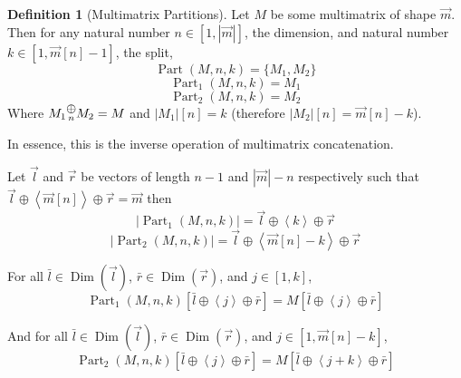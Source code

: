 \documentclass[12pt]{book}
\theoremstyle{plain}
\theoremstyle{definition}
\newtheorem{definition}{Definition}[chapter]
\theoremstyle{ppart}
\theoremstyle{case}
\theoremstyle{solution}
\DeclareMathOperator{\Dim}{Dim}
\DeclareMathOperator{\Part}{Part}
\newcommand{\mconcat}[1]{\text{\raisebox{1ex}{$\underset{#1}{\oplus}$}}}
\newcommand{\shape}[1]{\left|#1\right|}
\begin{document}
\begin{definition}[Multimatrix Partitions]
Let $M$ be some multimatrix of shape $\vec{m}$.
Then for any natural number $n \in [1, \shape{\vec{m}}]$, the dimension,
and natural number $k \in [1,\vec{m}[n]-1]$, the split,
\[ \Part(M, n, k) = \{M_1, M_2\} \]
\[ \Part_1(M, n, k) = M_1 \]
\[ \Part_2(M, n, k) = M_2 \]
Where $M_1 \mconcat{n} M_2 = M$ and $\shape{M_1}[n] = k$ (therefore $\shape{M_2}[n] = \vec{m}[n]-k$).

In essence, this is the inverse operation of multimatrix concatenation.

Let $\vec{l}$ and $\vec{r}$ be vectors of length $n-1$ and $\shape{\vec{m}}-n$ respectively
such that $\vec{l} \oplus \left<\vec{m}[n]\right> \oplus \vec{r} = \vec{m}$ then
\[ \shape{\Part_1(M, n, k)} = \vec{l} \oplus \left<k\right> \oplus \vec{r} \]
\[ \shape{\Part_2(M, n, k)} = \vec{l} \oplus \left<\vec{m}[n]-k\right> \oplus \vec{r} \]

For all $\bar{l} \in \Dim(\vec{l})$, $\bar{r} \in \Dim(\vec{r})$, and $j \in [1, k]$,
\[ \Part_1(M, n, k)[\bar{l} \oplus \left<j\right> \oplus \bar{r}] = M[\bar{l} \oplus \left<j\right> \oplus \bar{r}] \]

And for all $\bar{l} \in \Dim(\vec{l})$, $\bar{r} \in \Dim(\vec{r})$, and $j \in [1, \vec{m}[n]-k]$,
\[ \Part_2(M, n, k)[\bar{l} \oplus \left<j\right> \oplus \bar{r}] = M[\bar{l} \oplus \left<j+k\right> \oplus \bar{r}] \]
\end{definition}
\end{document}
